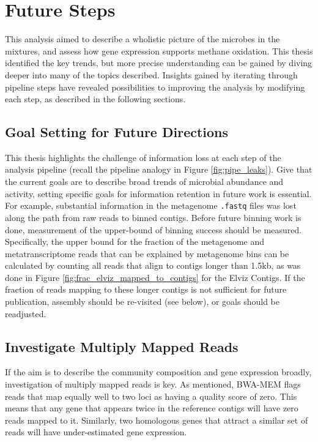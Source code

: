 \section{Future Steps}
\label{chA_future_steps}


This analysis aimed to describe a wholistic picture of the microbes in the mixtures, and assess how gene expression supports methane oxidation.
This thesis identified the key trends, but more precise understanding can be gained by diving deeper into many of the topics described.
Insights gained by iterating through pipeline steps have revealed possibilities to improving the analysis by modifying each step, as described in the following sections.

\subsection{Goal Setting for Future Directions}

This thesis highlights the challenge of information loss at each step of the analysis pipeline (recall the pipeline analogy in Figure \ref{fig:pipe_leaks}).
Give that the current goals are to describe broad trends of microbial abundance and activity, setting specific goals for information retention in future work is essential.
For example, substantial information in the metagenome \texttt{.fastq} files was lost along the path from raw reads to binned contigs.
Before future binning work is done, measurement of the upper-bound of binning success should be measured.
Specifically, the upper bound for the fraction of the metagenome and metatranscriptome reads that can be explained by metagenome bins can be calculated by counting all reads that align to contigs longer than 1.5kb, as was done in Figure \ref{fig:frac_elviz_mapped_to_contigs} for the Elviz Contigs.
If the fraction of reads mapping to these longer contigs is not sufficient for future publication, assembly should be re-visited (see below), or goals should be readjusted.


\subsection{Investigate Multiply Mapped Reads}
\label{sect:multiply_mapped_reads}

If the aim is to describe the community composition and gene expression broadly, investigation of multiply mapped reads is key.
As mentioned, BWA-MEM flags reads that map equally well to two loci as having a quality score of zero.
This means that any gene that appears twice in the reference contigs will have zero reads mapped to it.
Similarly, two homologous genes that attract a similar set of reads will have under-estimated gene expression.

